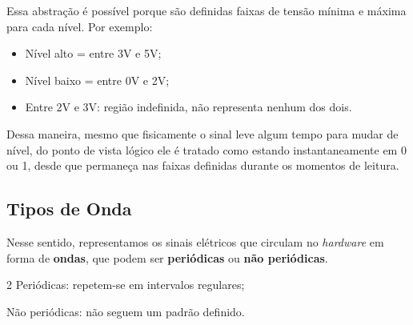 \documentclass[12pt]{article}
\begin{document}
\noindent
Essa abstração é possível porque são definidas faixas de tensão mínima e máxima para cada nível. Por exemplo:

\begin{itemize}
    \item Nível alto = entre 3V e 5V;
    \item Nível baixo = entre 0V e 2V;
    \item Entre 2V e 3V: região indefinida, não representa nenhum dos dois.
\end{itemize}

\noindent
Dessa maneira, mesmo que fisicamente o sinal leve algum tempo para mudar de nível, do ponto de vista lógico ele é tratado como estando instantaneamente em 0 ou 1, desde que permaneça nas faixas definidas durante os momentos de leitura.

\subsection{Tipos de Onda}
Nesse sentido, representamos os sinais elétricos que circulam no \textit{hardware} em forma de \textbf{ondas}, que podem ser \textbf{periódicas} ou \textbf{não periódicas}.

\begin{multicols}{2}
\noindent
Periódicas: repetem-se em intervalos regulares;
\vspace{0.05cm}


\columnbreak

\noindent
Não periódicas: não seguem um padrão definido.
\vspace{0.2cm}


\end{multicols}
\end{document}
